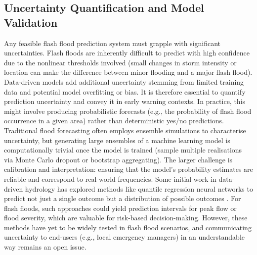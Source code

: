 \subsection{Uncertainty Quantification and Model Validation} 
Any feasible flash flood prediction system must grapple with significant uncertainties. Flash floods are inherently difficult to predict with high confidence due to the nonlinear thresholds involved (small changes in storm intensity or location can make the difference between minor flooding and a major flash flood). Data-driven models add additional uncertainty stemming from limited training data and potential model overfitting or bias. It is therefore essential to quantify prediction uncertainty and convey it in early warning contexts. In practice, this might involve producing probabilistic forecasts (e.g., the probability of flash flood occurrence in a given area) rather than deterministic yes/no predictions. Traditional flood forecasting often employs ensemble simulations to characterise uncertainty, but generating large ensembles of a machine learning model is computationally trivial once the model is trained (sample multiple realisations via Monte Carlo dropout or bootstrap aggregating). The larger challenge is calibration and interpretation: ensuring that the model’s probability estimates are reliable and correspond to real-world frequencies. Some initial work in data-driven hydrology has explored methods like quantile regression neural networks to predict not just a single outcome but a distribution of possible outcomes \citep{Zhong2023}. For flash floods, such approaches could yield prediction intervals for peak flow or flood severity, which are valuable for risk-based decision-making. However, these methods have yet to be widely tested in flash flood scenarios, and communicating uncertainty to end-users (e.g., local emergency managers) in an understandable way remains an open issue. 


